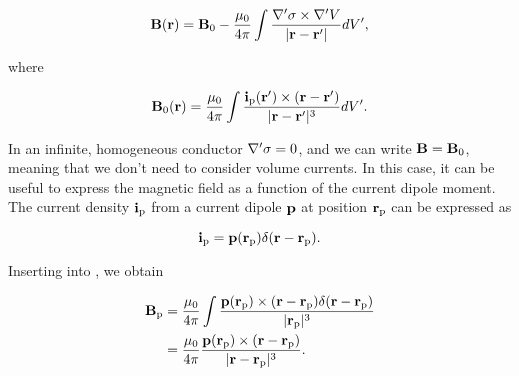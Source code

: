{\begin{equation}\label{eq:MEG:ampere-laplace-split}
{\bf B}({\bf r}) = {\bf B}_\mathrm{0} - \frac{\mu_0}{4\pi} \int \frac{{\bf \nabla}' \sigma \times {\bf \nabla}' V}{|{\bf r} - {\bf r}'|} dV',
\end{equation}

where 

\begin{equation}\label{eq:MEG:B0}
{\bf B}_0({\bf r}) = \frac{\mu_0}{4\pi} \int \frac{ {\bf i}_\mathrm{p}({\bf r}') \times ({\bf r} - {\bf r}')}{|{\bf r} - {\bf r}'|^3} dV'.
\end{equation}

In an infinite, homogeneous conductor ${\bf \nabla}'\sigma = 0$, and we can write ${\bf B} = {\bf B}_\mathrm{0}$, meaning that we don't need to consider volume currents. In this case, it can be useful to express the magnetic field as a function of the current dipole moment. The current density ${\bf i}_\mathrm{p}$ from a current dipole ${\bf p}$ at position ${\bf r}_\mathrm{p}$ can be expressed as

\begin{equation}\label{eq:MEG:i_dipole}
{\bf i}_\mathrm{p} = {\bf p}({\bf r}_\mathrm{p}) \delta ({\bf r} - {\bf r}_\mathrm{p}).
\end{equation}

Inserting  into , we obtain

\begin{align}\label{eq:MEG:biot-savart}
{\bf B}_\mathrm{p} &= \frac{\mu_0}{4 \pi} \int \frac{{\bf p}({\bf r}_\mathrm{p}) \times ({\bf r} - {\bf r}_\mathrm{p}) \delta ({\bf r} - {\bf r}_\mathrm{p})}{|{\bf r}_\mathrm{p}|^3} \nonumber \\
&= \frac{\mu_0}{4 \pi} \frac{{\bf p}({\bf r}_\mathrm{p}) \times ({\bf r} - {\bf r}_\mathrm{p})}{|{\bf r} - {\bf r}_\mathrm{p}|^3}.
\end{align}


}

